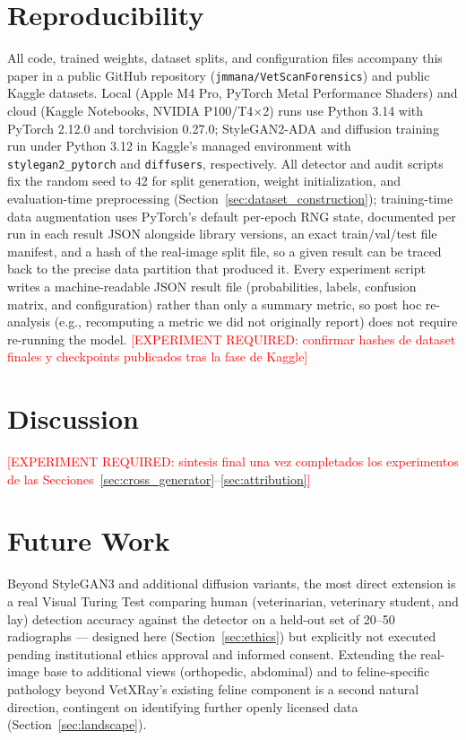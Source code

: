 \documentclass[journal]{IEEEtran}
\newcommand{\pending}[1]{\textcolor{red}{[EXPERIMENT REQUIRED: #1]}}
\begin{document}
\section{Reproducibility}
\label{sec:reproducibility}

All code, trained weights, dataset splits, and configuration files accompany this paper in a public GitHub repository (\texttt{jmmana/VetScanForensics}) and public Kaggle datasets. Local (Apple M4 Pro, PyTorch Metal Performance Shaders) and cloud (Kaggle Notebooks, NVIDIA P100/T4$\times$2) runs use Python 3.14 with PyTorch 2.12.0 and torchvision 0.27.0; StyleGAN2-ADA and diffusion training run under Python 3.12 in Kaggle's managed environment with \texttt{stylegan2\_pytorch} and \texttt{diffusers}, respectively. All detector and audit scripts fix the random seed to 42 for split generation, weight initialization, and evaluation-time preprocessing (Section~\ref{sec:dataset_construction}); training-time data augmentation uses PyTorch's default per-epoch RNG state, documented per run in each result JSON alongside library versions, an exact train/val/test file manifest, and a hash of the real-image split file, so a given result can be traced back to the precise data partition that produced it. Every experiment script writes a machine-readable JSON result file (probabilities, labels, confusion matrix, and configuration) rather than only a summary metric, so post hoc re-analysis (e.g., recomputing a metric we did not originally report) does not require re-running the model. \pending{confirmar hashes de dataset finales y checkpoints publicados tras la fase de Kaggle}

\section{Discussion}
\label{sec:discussion}

\pending{sintesis final una vez completados los experimentos de las Secciones~\ref{sec:cross_generator}--\ref{sec:attribution}}

\section{Future Work}
\label{sec:future_work}

Beyond StyleGAN3 and additional diffusion variants, the most direct extension is a real Visual Turing Test comparing human (veterinarian, veterinary student, and lay) detection accuracy against the detector on a held-out set of 20--50 radiographs — designed here (Section~\ref{sec:ethics}) but explicitly not executed pending institutional ethics approval and informed consent. Extending the real-image base to additional views (orthopedic, abdominal) and to feline-specific pathology beyond VetXRay's existing feline component is a second natural direction, contingent on identifying further openly licensed data (Section~\ref{sec:landscape}).
\end{document}

